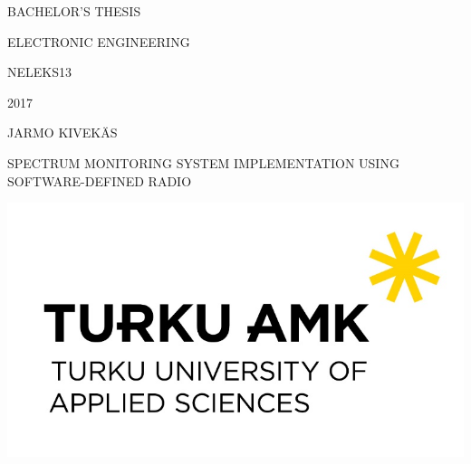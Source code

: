 
\begin{titlepage}
    BACHELOR'S THESIS

    ELECTRONIC ENGINEERING

    NELEKS13

    2017

    {
        \addtolength{\leftskip}{0.886in}
    	\vspace{5cm}
        JARMO KIVEKÄS\par
    	{\Huge SPECTRUM MONITORING SYSTEM IMPLEMENTATION USING SOFTWARE-DEFINED RADIO\par}
    }
    \vfill
    {
        \centering
    	\includegraphics{img/tuas-logo}\par\vspace{1cm}
    }
\end{titlepage}
